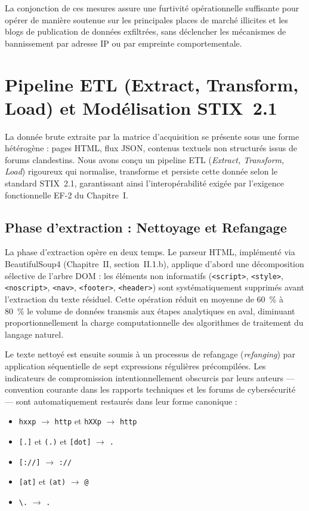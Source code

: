 La conjonction de ces mesures assure une furtivité opérationnelle suffisante pour opérer de manière soutenue sur les principales places de marché illicites et les blogs de publication de données exfiltrées, sans déclencher les mécanismes de bannissement par adresse IP ou par empreinte comportementale.

\section{Pipeline ETL (Extract, Transform, Load) et Modélisation STIX~2.1}

La donnée brute extraite par la matrice d'acquisition se présente sous une forme hétérogène : pages HTML, flux JSON, contenus textuels non structurés issus de forums clandestins. Nous avons conçu un pipeline ETL (\textit{Extract, Transform, Load}) rigoureux qui normalise, transforme et persiste cette donnée selon le standard STIX~2.1, garantissant ainsi l'interopérabilité exigée par l'exigence fonctionnelle EF-2 du Chapitre~I.

\subsection{Phase d'extraction : Nettoyage et Refangage}

La phase d'extraction opère en deux temps. Le parseur HTML, implémenté via BeautifulSoup4 (Chapitre~II, section~II.1.b), applique d'abord une décomposition sélective de l'arbre DOM : les éléments non informatifs (\texttt{<script>}, \texttt{<style>}, \texttt{<noscript>}, \texttt{<nav>}, \texttt{<footer>}, \texttt{<header>}) sont systématiquement supprimés avant l'extraction du texte résiduel. Cette opération réduit en moyenne de 60~\% à 80~\% le volume de données transmis aux étapes analytiques en aval, diminuant proportionnellement la charge computationnelle des algorithmes de traitement du langage naturel.

Le texte nettoyé est ensuite soumis à un processus de refangage (\textit{refanging}) par application séquentielle de sept expressions régulières précompilées. Les indicateurs de compromission intentionnellement obscurcis par leurs auteurs --- convention courante dans les rapports techniques et les forums de cybersécurité --- sont automatiquement restaurés dans leur forme canonique :

\begin{itemize}
    \item \texttt{hxxp} $\rightarrow$ \texttt{http} et \texttt{hXXp} $\rightarrow$ \texttt{http}
    \item \texttt{[.]} et \texttt{(.)} et \texttt{[dot]} $\rightarrow$ \texttt{.}
    \item \texttt{[://]} $\rightarrow$ \texttt{://}
    \item \texttt{[at]} et \texttt{(at)} $\rightarrow$ \texttt{@}
    \item \texttt{\textbackslash.} $\rightarrow$ \texttt{.}
\end{itemize}

